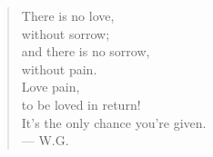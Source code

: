 \begin{verse}
There is no love, \\
without sorrow; \\
and there is no sorrow, \\
without pain. \\
Love pain, \\
to be loved in return! \\
It's the only chance you're given. \\
--- W.G.
\end{verse}

